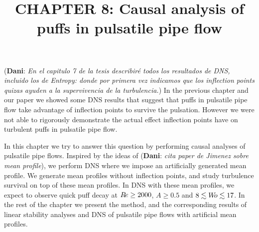 \documentclass{article}
\title{CHAPTER 8: Causal analysis of puffs in pulsatile pipe flow}
\date{}
\DeclareRobustCommand{\dm}[1]{{\color{blue}(\textbf{Dani}: \textit{#1}\xspace)}}
\DeclareRobustCommand{\Reynolds}{\ensuremath{R\hspace{-0.1em}e}\xspace}     %
\DeclareRobustCommand{\Womersley}{\ensuremath{W\hspace{-0.25em}o}\xspace}    %
\DeclareRobustCommand{\Amplitude}{\ensuremath{A}\xspace}    %
\begin{document}
\maketitle
\dm{En el capitulo 7 de la tesis describiré todos los resultados de DNS, incluido los de Entropy: donde por primera vez indicamos que los inflection points quizas ayuden a la supervivencia de la turbulencia.} In the previous chapter and our paper \citep{entropy2021} we showed some DNS results that suggest that puffs in pulsatile pipe flow take advantage of inflection points to survive the pulsation. However we were not able to rigorously demonstrate the actual effect inflection points have on turbulent puffs in pulsatile pipe flow. 

In this chapter we try to answer this question by performing causal analyses of pulsatile pipe flows. Inspired by the ideas of \dm{cita paper de Jimenez sobre mean profile}, we perform DNS where we impose an artificially generated mean profile. We generate mean profiles without inflection points, and study turbulence survival on top of these mean profiles. In DNS with these mean profiles, we expect to observe quick puff decay at $\Reynolds \geq 2000$, $\Amplitude \geq 0.5$ and $8 \lesssim \Womersley \lesssim 17$. In the rest of the chapter we present the method, and the corresponding results of linear stability analyses and DNS of pulsatile pipe flows with artificial mean profiles.

















\end{document}
